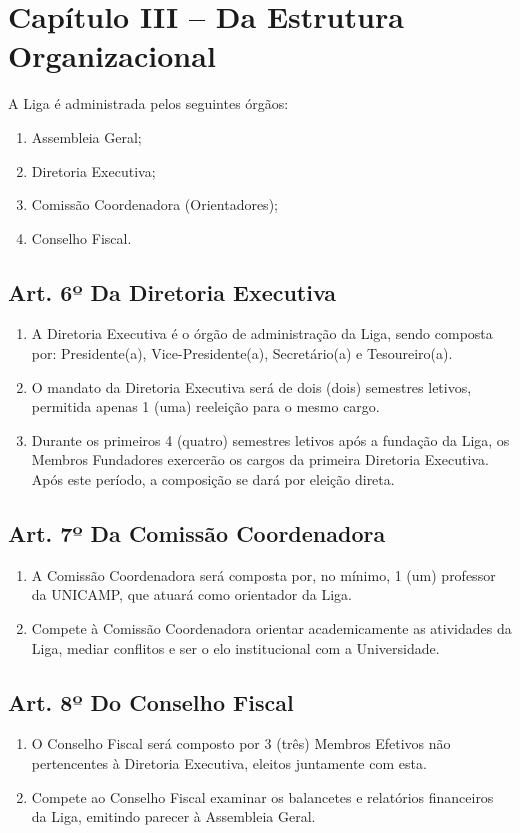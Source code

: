 \documentclass[12pt, a4paper]{article}
\begin{document}
\section{Capítulo III – Da Estrutura Organizacional}


A Liga é administrada pelos seguintes órgãos:
\begin{enumerate}[label=\alph*)]
    \item Assembleia Geral;
    \item Diretoria Executiva;
    \item Comissão Coordenadora (Orientadores);
    \item Conselho Fiscal.
\end{enumerate}

\subsection{Art. 6º Da Diretoria Executiva}
\begin{enumerate}[label=\S \arabic*.]
    \item A Diretoria Executiva é o órgão de administração da Liga, sendo composta por: Presidente(a), Vice-Presidente(a), Secretário(a) e Tesoureiro(a).
    \item O mandato da Diretoria Executiva será de dois (dois) semestres letivos, permitida apenas 1 (uma) reeleição para o mesmo cargo.
    \item Durante os primeiros 4 (quatro) semestres letivos após a fundação da Liga, os Membros Fundadores exercerão os cargos da primeira Diretoria Executiva. Após este período, a composição se dará por eleição direta.
\end{enumerate}

\subsection{Art. 7º Da Comissão Coordenadora}
\begin{enumerate}[label=\S \arabic*.]
    \item A Comissão Coordenadora será composta por, no mínimo, 1 (um) professor da UNICAMP, que atuará como orientador da Liga.
    \item Compete à Comissão Coordenadora orientar academicamente as atividades da Liga, mediar conflitos e ser o elo institucional com a Universidade.
\end{enumerate}

\subsection{Art. 8º Do Conselho Fiscal}
\begin{enumerate}[label=\S \arabic*.]
    \item O Conselho Fiscal será composto por 3 (três) Membros Efetivos não pertencentes à Diretoria Executiva, eleitos juntamente com esta.
    \item Compete ao Conselho Fiscal examinar os balancetes e relatórios financeiros da Liga, emitindo parecer à Assembleia Geral.
\end{enumerate}
\end{document}
